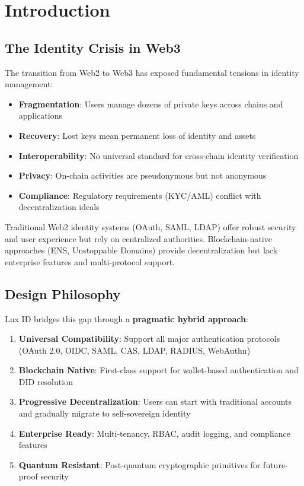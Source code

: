 \section{Introduction}


\subsection{The Identity Crisis in Web3}

The transition from Web2 to Web3 has exposed fundamental tensions in identity management:

\begin{itemize}
  \item \textbf{Fragmentation}: Users manage dozens of private keys across chains and applications
  \item \textbf{Recovery}: Lost keys mean permanent loss of identity and assets
  \item \textbf{Interoperability}: No universal standard for cross-chain identity verification
  \item \textbf{Privacy}: On-chain activities are pseudonymous but not anonymous
  \item \textbf{Compliance}: Regulatory requirements (KYC/AML) conflict with decentralization ideals
\end{itemize}

Traditional Web2 identity systems (OAuth, SAML, LDAP) offer robust security and user experience but rely on centralized authorities. Blockchain-native approaches (ENS, Unstoppable Domains) provide decentralization but lack enterprise features and multi-protocol support.

\subsection{Design Philosophy}

Lux ID bridges this gap through a \textbf{pragmatic hybrid approach}:

\begin{enumerate}
  \item \textbf{Universal Compatibility}: Support all major authentication protocols (OAuth 2.0, OIDC, SAML, CAS, LDAP, RADIUS, WebAuthn)
  \item \textbf{Blockchain Native}: First-class support for wallet-based authentication and DID resolution
  \item \textbf{Progressive Decentralization}: Users can start with traditional accounts and gradually migrate to self-sovereign identity
  \item \textbf{Enterprise Ready}: Multi-tenancy, RBAC, audit logging, and compliance features
  \item \textbf{Quantum Resistant}: Post-quantum cryptographic primitives for future-proof security
\end{enumerate}

